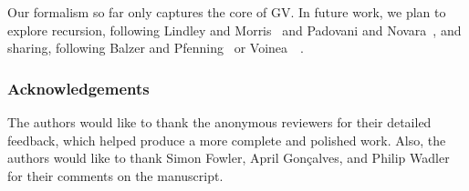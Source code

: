 Our formalism so far only captures the core of GV. In future work, we plan to explore recursion, following Lindley and Morris~\cite{lindleymorris16} and Padovani and Novara~\cite{padovaninovara15}, and sharing, following Balzer and Pfenning~\cite{balzerpfenning17} or Voinea~\etal~\cite{VoineaDG19}.

\subsubsection*{Acknowledgements}
The authors would like to thank the anonymous reviewers for their detailed feedback, which helped produce a more complete and polished work.
Also, the authors would like to thank Simon Fowler, April Gon\c{c}alves, and Philip Wadler for their comments on the manuscript.

